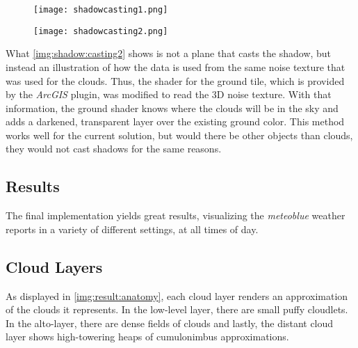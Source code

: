 \begin{figure}[H]
    \centering
        \begin{minipage}{0.47\linewidth}
            \texttt{[image: shadowcasting1.png]}
            \label{img:shadow:casting1}
        \end{minipage}
    \hfill
        \begin{minipage}{0.47\linewidth}
            \texttt{[image: shadowcasting2.png]}
            \label{img:shadow:casting2}
        \end{minipage}
\end{figure}

\noindent
What \autoref{img:shadow:casting2} shows is not a plane that casts the shadow, but instead an illustration of how the data is used from the same \gls{noise} texture that was used for the clouds.
Thus, the shader for the ground tile, which is provided by the \emph{ArcGIS} plugin, was modified to read the 3D \gls{noise} texture.
With that information, the ground shader knows where the clouds will be in the sky and adds a darkened, transparent layer over the existing ground color.
\emptyline
This method works well for the current solution, but would there be other objects than clouds, they would not cast shadows for the same reasons.

\clearpage

\subsection{Results}
\label{section:techimpl:results}
The final implementation yields great results, visualizing the \emph{meteoblue} weather reports in a variety of different settings, at all times of day.

\subsection{Cloud Layers}
As displayed in \autoref{img:result:anatomy}, each cloud layer renders an approximation of the clouds it represents.
In the low-level layer, there are small puffy \gls{cloudlet}s. In the alto-layer, there are dense fields of clouds and lastly, the distant cloud layer shows high-towering heaps of cumulonimbus approximations.

